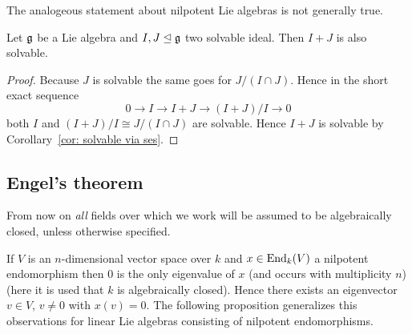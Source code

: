\begin{rem}
 The analogeous statement about nilpotent Lie algebras is not generally true.
\end{rem}


\begin{cor}
 Let $\mathfrak{g}$ be a Lie algebra and $I, J \trianglelefteq \mathfrak{g}$ two solvable ideal. Then $I + J$ is also solvable.
\end{cor}
\begin{proof}
 Because $J$ is solvable the same goes for $J/(I \cap J)$. Hence in the short exact sequence
 \[
  0 \to I \to I+J \to (I+J)/I \to 0
 \]
 both $I$ and $(I+J)/I \cong J/(I \cap J)$ are solvable. Hence $I+J$ is solvable by Corollary~\ref{cor: solvable via ses}.
\end{proof}




\subsection{Engel’s theorem}


From now on \emph{all} fields over which we work will be assumed to be algebraically closed, unless otherwise specified.


If $V$ is an $n$-dimensional vector space over $k$ and $x \in \operatorname{End}_k(V)$ a nilpotent endomorphism then $0$ is the only eigenvalue of $x$ (and occurs with multiplicity $n$) (here it is used that $k$ is algebraically closed). Hence there exists an eigenvector $v \in V$, $v \neq 0$ with $x(v) = 0$. The following proposition generalizes this observations for linear Lie algebras consisting of nilpotent endomorphisms.


